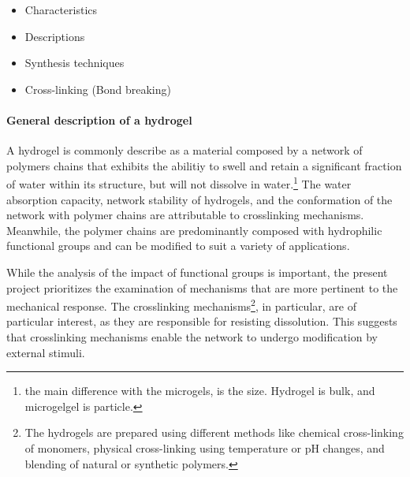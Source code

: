 \begin{itemize}
    \item Characteristics
    \item Descriptions 
    \item Synthesis techniques
    \item Cross-linking (Bond breaking)
\end{itemize}

\paragraph{General description of a hydrogel}
A hydrogel is commonly describe as a material composed by a network of polymers chains that exhibits the abilitiy to swell and retain a significant fraction of water within its structure, but will not dissolve in water\citep{ahmedHydrogelPreparationCharacterization2015a,ahmedHydrogelsMicrogelsDriving2025,priyaComprehensiveReviewHydrogel2024,bustamante-torresHydrogelsClassificationAccording2021}.\footnote{the main difference with the microgels, is the size. Hydrogel is bulk, and microgelgel is particle.}
The water absorption capacity, network stability of hydrogels, and the conformation of the network with polymer chains are attributable to crosslinking mechanisms\citep{priyaComprehensiveReviewHydrogel2024,ahmedHydrogelPreparationCharacterization2015a}.
Meanwhile, the polymer chains are predominantly composed with hydrophilic functional groups and can be modified to suit a variety of applications\citep{ahmedHydrogelPreparationCharacterization2015a,priyaComprehensiveReviewHydrogel2024,bustamante-torresHydrogelsClassificationAccording2021}.


While the analysis of the impact of functional groups is important, the present project prioritizes the examination of mechanisms that are more pertinent to the mechanical response. 
The crosslinking mechanisms\footnote{The hydrogels are prepared using different methods like chemical cross-linking of monomers, physical cross-linking using temperature or pH changes, and blending of natural or synthetic polymers.}, in particular, are of particular interest, as they are responsible for resisting dissolution. 
This suggests that crosslinking mechanisms enable the network to undergo modification by external stimuli.

